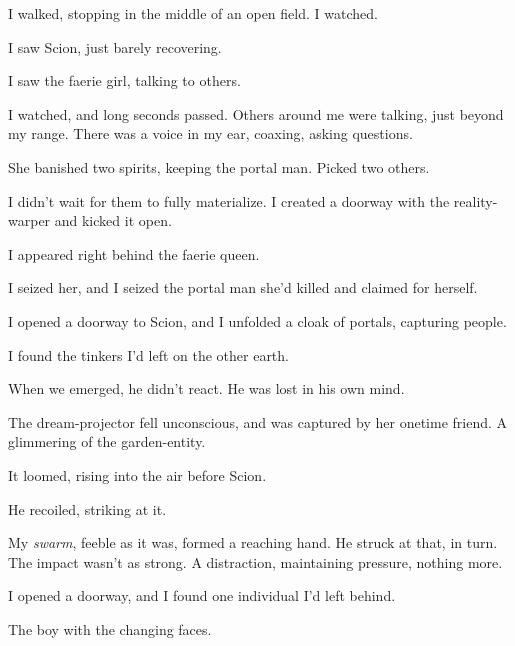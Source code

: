 I walked, stopping in the middle of an open field.  I watched.



I saw Scion, just barely recovering.



I saw the faerie girl, talking to others.



I watched, and long seconds passed.  Others around me were talking, just beyond my range.  There was a voice in my ear, coaxing, asking questions.



She banished two spirits, keeping the portal man.  Picked two others.



I didn't wait for them to fully materialize.  I created a doorway with the reality-warper and kicked it open.



I appeared right behind the faerie queen.



I seized her, and I seized the portal man she'd killed and claimed for herself.



I opened a doorway to Scion, and I unfolded a cloak of portals, capturing people.



I found the tinkers I'd left on the other earth.



When we emerged, he didn't react.  He was lost in his own mind.



The dream-projector fell unconscious, and was captured by her onetime friend.  A glimmering of the garden-entity.



It loomed, rising into the air before Scion.



He recoiled, striking at it.



My \emph{swarm}, feeble as it was, formed a reaching hand.  He struck at that, in turn.  The impact wasn't as strong.  A distraction, maintaining pressure, nothing more.



I opened a doorway, and I found one individual I'd left behind.



The boy with the changing faces.



